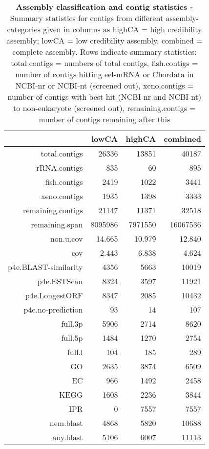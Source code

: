 \begin{table}[!h]
  \begin{center}
  \begin{tabular}{rrrr}
  \hline
 & lowCA & highCA & combined \\ 
  \hline
total.contigs & 26336 & 13851 & 40187 \\ 
  rRNA.contigs & 835 & 60 & 895 \\ 
  fish.contigs & 2419 & 1022 & 3441 \\ 
  xeno.contigs & 1935 & 1398 & 3333 \\ 
  remaining.contigs & 21147 & 11371 & 32518 \\ 
  remaining.span & 8095986 & 7971550 & 16067536 \\ 
  non.u.cov & 14.665 & 10.979 & 12.840 \\ 
  cov & 2.443 & 6.838 & 4.624 \\ 
  p4e.BLAST-similarity & 4356 & 5663 & 10019 \\ 
  p4e.ESTScan & 8324 & 3597 & 11921 \\ 
  p4e.LongestORF & 8347 & 2085 & 10432 \\ 
  p4e.no-prediction & 93 & 14 & 107 \\ 
  full.3p & 5906 & 2714 & 8620 \\ 
  full.5p & 1484 & 1270 & 2754 \\ 
  full.l & 104 & 185 & 289 \\ 
  GO & 2635 & 3874 & 6509 \\ 
  EC & 966 & 1492 & 2458 \\ 
  KEGG & 1608 & 2236 & 3844 \\ 
  IPR & 0 & 7557 & 7557 \\ 
  nem.blast & 4868 & 5820 & 10688 \\ 
  any.blast & 5106 & 6007 & 11113 \\ 
   \hline
\end{tabular}
\caption[Assembly classification and contig
statistics]{\textbf{Assembly classification and contig statistics -}
  Summary statistics for contigs from different assembly-categories
  given in columns as highCA = high credibility assembly; lowCA = low
  credibility assembly, combined = complete assembly. Rows indicate
  summary statistics: total.contigs = numbers of total contigs,
  fish.contigs = number of contigs hitting eel-mRNA or Chordata in
  NCBI-nr or NCBI-nt (screened out), xeno.contigs = number of contigs
  with best hit (NCBI-nr and NCBI-nt) to non-eukaryote (screened out),
  remaining.contigs = number of contigs remaining after this
}
\end{center}
\end{table}

